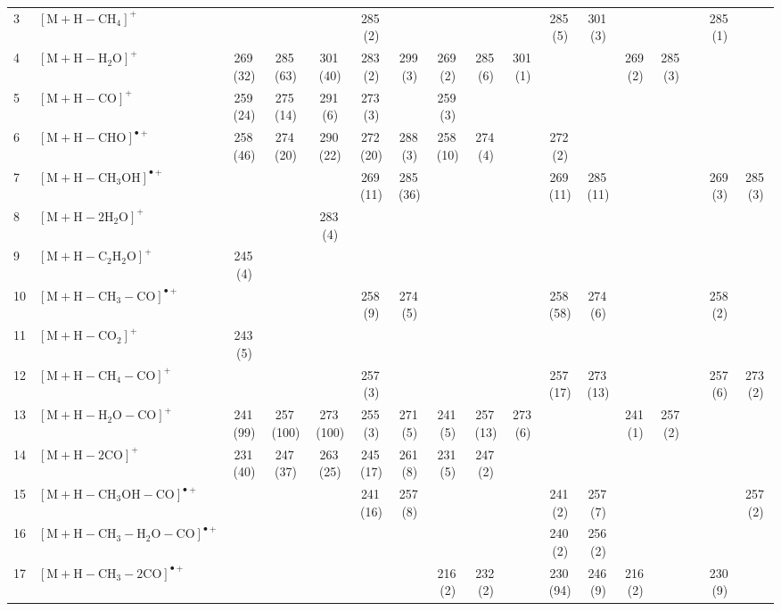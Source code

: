 \documentclass[]{article}
\begin{document}
\begin{table}
{\begin{tabular}{ll|ccccc|ccccc|ccccc}
  3 & $\mathrm{[M{+}H{-}CH_{4}]^+}$ &  &  &  & 285\,(2) &  &  &  &  & 285\,(5) & 301\,(3) &  &  &  & 285\,(1) &  \\ 
  4 & $\mathrm{[M{+}H{-}H_{2}O]^+}$ & 269\,(32) & 285\,(63) & 301\,(40) & 283\,(2) & 299\,(3) & 269\,(2) & 285\,(6) & 301\,(1) &  &  & 269\,(2) & 285\,(3) &  &  &  \\ 
  5 & $\mathrm{[M{+}H{-}CO]^+}$ & 259\,(24) & 275\,(14) & 291\,(6) & 273\,(3) &  & 259\,(3) &  &  &  &  &  &  &  &  &  \\ 
  6 & $\mathrm{[M{+}H{-}CHO]^{\bullet+}}$ & 258\,(46) & 274\,(20) & 290\,(22) & 272\,(20) & 288\,(3) & 258\,(10) & 274\,(4) &  & 272\,(2) &  &  &  &  &  &  \\ 
  7 & $\mathrm{[M{+}H{-}CH_{3}OH]^{\bullet+}}$ &  &  &  & 269\,(11) & 285\,(36) &  &  &  & 269\,(11) & 285\,(11) &  &  &  & 269\,(3) & 285\,(3) \\ 
  8 & $\mathrm{[M{+}H{-}2H_{2}O]^+}$ &  &  & 283\,(4) &  &  &  &  &  &  &  &  &  &  &  &  \\ 
  9 & $\mathrm{[M{+}H{-}C_{2}H_{2}O]^+}$ & 245\,(4) &  &  &  &  &  &  &  &  &  &  &  &  &  &  \\ 
  10 & $\mathrm{[M{+}H{-}CH_{3}{-}CO]^{\bullet+}}$ &  &  &  & 258\,(9) & 274\,(5) &  &  &  & 258\,(58) & 274\,(6) &  &  &  & 258\,(2) &  \\ 
  11 & $\mathrm{[M{+}H{-}CO_{2}]^+}$ & 243\,(5) &  &  &  &  &  &  &  &  &  &  &  &  &  &  \\ 
  12 & $\mathrm{[M{+}H{-}CH_{4}{-}CO]^+}$ &  &  &  & 257\,(3) &  &  &  &  & 257\,(17) & 273\,(13) &  &  &  & 257\,(6) & 273\,(2) \\ 
  13 & $\mathrm{[M{+}H{-}H_{2}O{-}CO]^+}$ & 241\,(99) & 257\,(100) & 273\,(100) & 255\,(3) & 271\,(5) & 241\,(5) & 257\,(13) & 273\,(6) &  &  & 241\,(1) & 257\,(2) &  &  &  \\ 
  14 & $\mathrm{[M{+}H{-}2CO]^+}$ & 231\,(40) & 247\,(37) & 263\,(25) & 245\,(17) & 261\,(8) & 231\,(5) & 247\,(2) &  &  &  &  &  &  &  &  \\ 
  15 & $\mathrm{[M{+}H{-}CH_{3}OH{-}CO]^{\bullet+}}$ &  &  &  & 241\,(16) & 257\,(8) &  &  &  & 241\,(2) & 257\,(7) &  &  &  &  & 257\,(2) \\ 
  16 & $\mathrm{[M{+}H{-}CH_{3}{-}H_{2}O{-}CO]^{\bullet+}}$ &  &  &  &  &  &  &  &  & 240\,(2) & 256\,(2) &  &  &  &  &  \\ 
  17 & $\mathrm{[M{+}H{-}CH_{3}{-}2CO]^{\bullet+}}$ &  &  &  &  &  & 216\,(2) & 232\,(2) &  & 230\,(94) & 246\,(9) & 216\,(2) &  &  & 230\,(9) &  \\ 

\end{tabular}}
\end{table}
\end{document}
